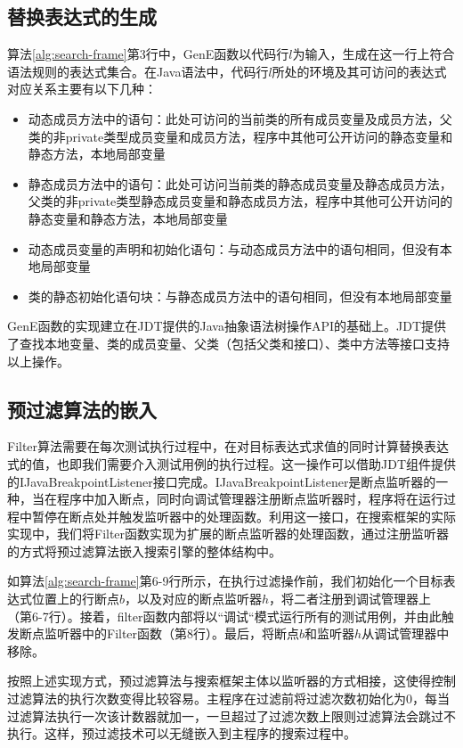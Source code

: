 \subsection{替换表达式的生成}
算法\ref{alg:search-frame}第3行中，GenE函数以代码行$l$为输入，生成在这一行上符合语法规则的表达式集合。在Java语法中，代码行$l$所处的环境及其可访问的表达式对应关系主要有以下几种：
\begin{itemize}
	\item 动态成员方法中的语句：此处可访问的当前类的所有成员变量及成员方法，父类的非private类型成员变量和成员方法，程序中其他可公开访问的静态变量和静态方法，本地局部变量
	\item 静态成员方法中的语句：此处可访问当前类的静态成员变量及静态成员方法，父类的非private类型静态成员变量和静态成员方法，程序中其他可公开访问的静态变量和静态方法，本地局部变量
	\item 动态成员变量的声明和初始化语句：与动态成员方法中的语句相同，但没有本地局部变量
	\item 类的静态初始化语句块：与静态成员方法中的语句相同，但没有本地局部变量
\end{itemize}

GenE函数的实现建立在JDT提供的Java抽象语法树操作API的基础上。JDT提供了查找本地变量、类的成员变量、父类（包括父类和接口）、类中方法等接口支持以上操作。

\subsection{预过滤算法的嵌入}

Filter算法需要在每次测试执行过程中，在对目标表达式求值的同时计算替换表达式的值，也即我们需要介入测试用例的执行过程。这一操作可以借助JDT组件提供的IJavaBreakpointListener接口完成。IJavaBreakpointListener是断点监听器的一种，当在程序中加入断点，同时向调试管理器注册断点监听器时，程序将在运行过程中暂停在断点处并触发监听器中的处理函数。利用这一接口，在搜索框架的实际实现中，我们将Filter函数实现为扩展的断点监听器的处理函数，通过注册监听器的方式将预过滤算法嵌入搜索引擎的整体结构中。

如算法\ref{alg:search-frame}第6-9行所示，在执行过滤操作前，我们初始化一个目标表达式位置上的行断点$b$，以及对应的断点监听器$h$，将二者注册到调试管理器上（第6-7行）。接着，filter函数内部将以“调试“模式运行所有的测试用例，并由此触发断点监听器中的Filter函数（第8行）。最后，将断点$b$和监听器$h$从调试管理器中移除。

按照上述实现方式，预过滤算法与搜索框架主体以监听器的方式相接，这使得控制过滤算法的执行次数变得比较容易。主程序在过滤前将过滤次数初始化为0，每当过滤算法执行一次该计数器就加一，一旦超过了过滤次数上限则过滤算法会跳过不执行。这样，预过滤技术可以无缝嵌入到主程序的搜索过程中。

